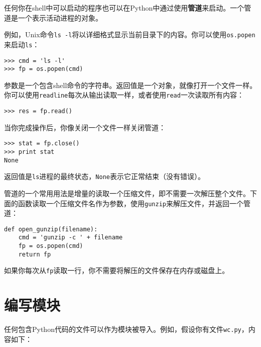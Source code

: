 
任何你在shell中可以启动的程序也可以在Python中通过使用{\bf 管道}来启动。一个管道是一个表示活动进程的对象。

例如，Unix命令{\tt ls -l}将以详细格式显示当前目录下的内容。你可以使用{\tt os.popen}来启动{\tt ls}：


\beforeverb
\begin{verbatim}
>>> cmd = 'ls -l'
>>> fp = os.popen(cmd)
\end{verbatim}
\afterverb
%
参数是一个包含shell命令的字符串。返回值是一个对象，就像打开一个文件一样。你可以使用{\tt readline}每次从输出读取一样，或者使用{\tt read}一次读取所有内容：


\beforeverb
\begin{verbatim}
>>> res = fp.read()
\end{verbatim}
\afterverb
%
当你完成操作后，你像关闭一个文件一样关闭管道：


\beforeverb
\begin{verbatim}
>>> stat = fp.close()
>>> print stat
None
\end{verbatim}
\afterverb
%
返回值是{\tt ls}进程的最终状态，{\tt None}表示它正常结束（没有错误）。


管道的一个常用用法是增量的读取一个压缩文件，即不需要一次解压整个文件。下面的函数读取一个压缩文件名作为参数，使用{\tt gunzip}来解压文件，并返回一个管道：

\beforeverb
\begin{verbatim}
def open_gunzip(filename):
    cmd = 'gunzip -c ' + filename
    fp = os.popen(cmd)
    return fp
\end{verbatim}
\afterverb
%
如果你每次从{\tt fp}读取一行，你不需要将解压的文件保存在内存或磁盘上。


\section{编写模块}
\label{模块}


任何包含Python代码的文件可以作为模块被导入。例如，假设你有文件{\tt wc.py}，内容如下：

